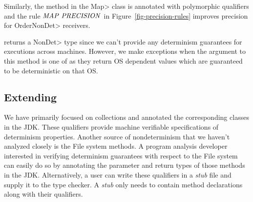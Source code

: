 Similarly, the  method in the \<Map> class is annotated with polymorphic qualifiers and the rule $\sc{\|MAP \ PRECISION|}$ in Figure~\ref{fig-precision-rules} improves precision for \<OrderNonDet> receivers.

 returns a \<NonDet> type since we can't provide any determinism guarantees for
executions across machines. However, we make exceptions when the argument to this method is one of 
 as they return OS dependent values which are guaranteed to be deterministic on that OS.

\subsection{Extending \theDeterminismChecker}\label{extending-det-checker}
We have primarily focused on collections and annotated the corresponding classes in the JDK.
These qualifiers provide machine verifiable specifications of determinism properties.
Another source of nondeterminism that we haven't analyzed closely is the File system methods.
A program analysis developer interested in verifying determinism guarantees with respect to 
the File system can easily do so by annotating the parameter and return types of those methods in the JDK.
Alternatively, a user can write these qualifiers in a \textit{stub} file and supply it to the type checker. A \textit{stub}
only needs to contain method declarations along with their qualifiers.

